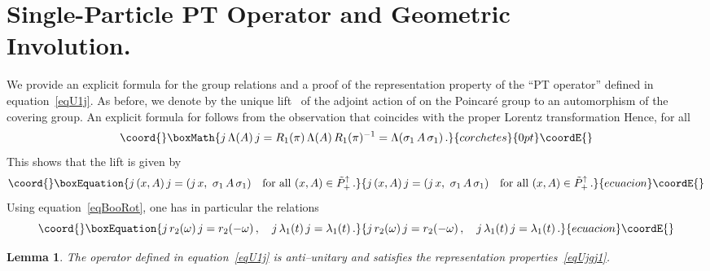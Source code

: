 \documentclass[a4paper,reqno,11pt]{amsart}
\theoremstyle{plain}
\newtheorem{Lem}[Thm]{Lemma}
\theoremstyle{definition}
\numberwithin{equation}{section}
\providecommand{\Bc}{\mathbb{C}}
\providecommand{\Potild}{\tilde{P}_+^{\uparrow}}
\providecommand{\Ums}{U_{m,s}}  %
\begin{document}
\section{Single-Particle PT Operator and Geo\-metric \\ In\-volution.} 
We provide an explicit formula for the group relations \coordHE{} and a
proof of the representation property of the ``PT operator'' 
\myHighlight{$\Ums(j)$}\coordHE{} defined in equation~\eqref{eqU1j}. 
As before, we denote by \coordHE{} the unique lift~\cite{Var2} of 
the adjoint  action of \coordHE{} on the  Poincar\'e group to an automorphism
of the covering group. An explicit formula for \coordHE{} follows from the 
observation that \coordHE{} coincides with the proper Lorentz transformation 
\coordHE{} Hence, for all \myHighlight{$A\in SL(2,\Bc)$}\coordHE{}  
\[\coord{}\boxMath{  j\,\Lambda(A) \,j=R_1(\pi)\,\Lambda(A) \,R_1(\pi)^{-1}
=\Lambda(\sigma_1\,A\,\sigma_1)\,.
}{corchetes}{0pt}\coordE{}\] 
This shows that the lift \coordHE{} is given by 
\begin{equation}\coord{}\boxEquation{  \label{eqjgj}
j\,(x,A)\,j=(j\, x,\, \,\sigma_1\,A\,\sigma_1) \quad \text{for all }
(x,A)\in\Potild\,.
}{  j\,(x,A)\,j=(j\, x,\, \,\sigma_1\,A\,\sigma_1) \quad \text{for all }
(x,A)\in\Potild\,.
}{ecuacion}\coordE{}\end{equation} 
Using equation~\eqref{eqBooRot}, one has in particular the relations 
\begin{equation}\coord{}\boxEquation{ \label{eqjr2j} 
j\,r_2(\omega)\,j= r_2(-\omega)\,,\quad 
j\,\lambda_1(t)\,j= \lambda_1(t)\,.
}{ j\,r_2(\omega)\,j= r_2(-\omega)\,,\quad 
j\,\lambda_1(t)\,j= \lambda_1(t)\,.
}{ecuacion}\coordE{}\end{equation}
\begin{Lem} \label{LemU1j} 
The operator \myHighlight{$\Ums(j)$}\coordHE{} defined in equation~\eqref{eqU1j} is
anti--unitary and satisfies the representation properties~\eqref{eqUjgj1}. 
\end{Lem}
\end{document}
